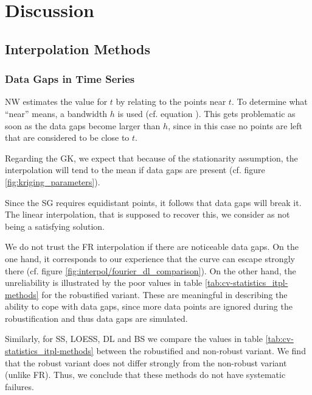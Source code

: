 \chapter{Discussion}\label{sec:discussion}


\section{Interpolation Methods}{ \label{sec:discussion_itpl}
    \subsection{Data Gaps in Time Series}\label{sec:discussion_itpl_data_gaps}{
        NW estimates the value for $t$ by relating to the points near $t$. To determine what ``near'' means, a bandwidth $h$ is used (cf. equation ). This gets problematic as soon as the data gaps become larger than $h$, since in this case no points are left that are considered to be close to $t$. 

        Regarding the GK, we expect that because of the stationarity assumption, the interpolation will tend to the mean if data gaps are present (cf. figure \ref{fig:kriging_parameters}). 

        Since the SG requires equidistant points, it follows that data gaps will break it. The linear interpolation, that is supposed to recover this, we consider as not being a satisfying solution.

        We do not trust the FR interpolation if there are noticeable data gaps. On the one hand, it corresponds to our experience that the curve can escape strongly there (cf. figure \ref{fig:interpol/fourier_dl_comparison}). On the other hand, the unreliability is illustrated by the poor values in table \ref{tab:cv-statistics_itpl-methods} for the robustified variant. These are meaningful in describing the ability to cope with data gaps, since more data points are ignored during the robustification and thus data gaps are simulated. 

        Similarly, for SS, LOESS, DL and BS we compare the values in table \ref{tab:cv-statistics_itpl-methods} between the robustified and non-robust variant. We find that the robust variant does not differ strongly from the non-robust variant (unlike FR). Thus, we conclude that these methods do not have systematic failures.

}}
